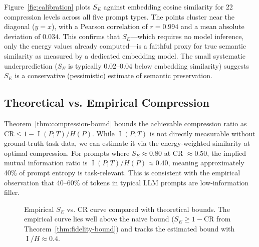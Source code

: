 \documentclass[11pt]{article}
\theoremstyle{remark}
\DeclareMathOperator{\MI}{I}
\begin{document}
Figure~\ref{fig:calibration} plots $S_E$ against embedding cosine similarity
for 22 compression levels across all five prompt types. The points cluster
near the diagonal ($y = x$), with a Pearson correlation of $r = 0.994$
and a mean absolute deviation of $0.034$. This confirms that
$S_E$---which requires no model inference, only the energy values already
computed---is a faithful proxy for true semantic similarity as measured
by a dedicated embedding model. The small systematic underprediction
($S_E$ is typically $0.02$--$0.04$ below embedding similarity) suggests
$S_E$ is a conservative (pessimistic) estimate of semantic preservation.

\subsection{Theoretical vs. Empirical Compression}

Theorem~\ref{thm:compression-bound} bounds the achievable compression ratio
as $\text{CR} \leq 1 - \MI(P; T)/H(P)$. While $\MI(P; T)$ is not directly
measurable without ground-truth task data, we can estimate it via the
energy-weighted similarity at optimal compression. For prompts where
$S_E \approx 0.80$ at CR $\approx 0.50$, the implied mutual information
ratio is $\MI(P; T)/H(P) \approx 0.40$, meaning approximately 40\% of
prompt entropy is task-relevant. This is consistent with the empirical
observation that 40--60\% of tokens in typical LLM prompts are
low-information filler.

\begin{figure}[H]
\centering
{}
\caption{Empirical $S_E$ vs. CR curve compared with theoretical bounds.
The empirical curve lies well above the naive bound ($S_E \geq 1 - \text{CR}$
from Theorem~\ref{thm:fidelity-bound}) and tracks the estimated bound with
$\MI/H \approx 0.4$.}
\label{fig:theoretical-vs-empirical}
\end{figure}
\end{document}
